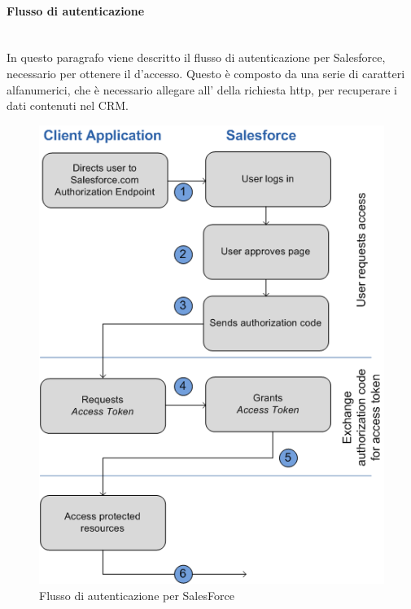 \documentclass[12pt,a4paper,twoside,openany,english]{book}
\begin{document}
			\paragraph{Flusso di autenticazione}~\\
			In questo paragrafo viene descritto il flusso di autenticazione per Salesforce, necessario per ottenere il  d'accesso.
			Questo  è composto da una serie di caratteri alfanumerici, che è necessario allegare all' della richiesta http, per recuperare i dati contenuti nel CRM.
				\begin{figure}[!hb]
					\centering
					\includegraphics[width=0.7\linewidth]{images/webServerAuthFlow}
					\caption{Flusso di autenticazione per SalesForce}
					\label{fig:webserverauthflow}
				\end{figure}
\end{document}
